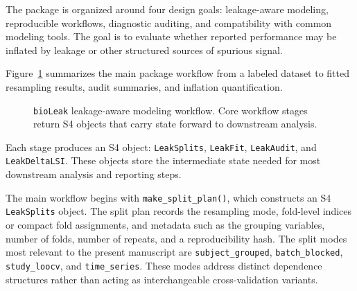 \documentclass[article]{jss}
\begin{document}
The package is organized around four design goals: leakage-aware modeling,
reproducible workflows, diagnostic auditing, and compatibility with common 
modeling tools. The goal is to evaluate whether reported performance may be inflated by leakage or other structured sources of spurious signal.

Figure~\ref{fig:workflow} summarizes the main package workflow from a labeled
dataset to fitted resampling results, audit summaries, and inflation
quantification.

\begin{figure}[tbp]
\centering
{}
\caption{\texttt{bioLeak} leakage-aware modeling workflow. Core workflow stages return S4 objects that carry state forward to downstream analysis.}
\label{fig:workflow}
\end{figure}

Each stage produces an S4 object: \texttt{LeakSplits}, \texttt{LeakFit},
\texttt{LeakAudit}, and \texttt{LeakDeltaLSI}. These objects store the intermediate state needed for most downstream analysis and reporting steps.

The main workflow begins with \texttt{make\_split\_plan()}, which constructs an
S4 \texttt{LeakSplits} object. The split plan records the resampling mode,
fold-level indices or compact fold assignments, and metadata such as the
grouping variables, number of folds, number of repeats, and a reproducibility
hash. The split modes most relevant to the present manuscript are
\texttt{subject\_grouped}, \texttt{batch\_blocked},
\texttt{study\_loocv}, and \texttt{time\_series}. These modes address distinct
dependence structures rather than acting as interchangeable cross-validation
variants.
\end{document}
